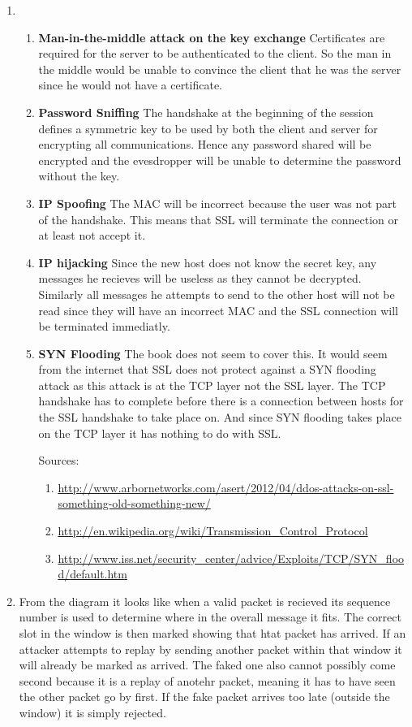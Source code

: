 \documentclass{article}
\begin{document}
\begin{enumerate}
  \item
    \begin{enumerate}
    \item 
      {\bf Man-in-the-middle attack on the key exchange} Certificates are required for the server to be authenticated to the client. So the man in the middle would be unable to convince the client that he was the server since he would not have a certificate.
    \item
      {\bf Password Sniffing} The handshake at the beginning of the session defines a symmetric key to be used by both the client and server for encrypting all communications. Hence any password shared will be encrypted and the evesdropper will be unable to determine the password without the key.
    \item
      {\bf IP Spoofing} The MAC will be incorrect because the user was not part of the handshake. This means that SSL will terminate the connection or at least not accept it.
    \item
      {\bf IP hijacking} Since the new host does not know the secret key, any messages he recieves will be useless as they cannot be decrypted. Similarly all messages he attempts to send to the other host will not be read since they will have an incorrect MAC and the SSL connection will be terminated immediatly.
    \item
      {\bf SYN Flooding} The book does not seem to cover this. It would seem from the internet that SSL does not protect against a SYN flooding attack as this attack is at the TCP layer not the SSL layer. The TCP handshake has to complete before there is a connection between hosts for the SSL handshake to take place on. And since SYN flooding takes place on the TCP layer it has nothing to do with SSL.
      
      Sources:
      \tiny
      \begin{enumerate}
      \item \url{http://www.arbornetworks.com/asert/2012/04/ddos-attacks-on-ssl-something-old-something-new/}
      \item \url{http://en.wikipedia.org/wiki/Transmission_Control_Protocol}
      \item \url{http://www.iss.net/security_center/advice/Exploits/TCP/SYN_flood/default.htm}
      \end{enumerate}
      \normalsize
    \end{enumerate}

  \item
    From the diagram it looks like when a valid packet is recieved its sequence number is used to determine where in the overall message it fits. The correct slot in the window is then marked showing that htat packet has arrived. If an attacker attempts to replay by sending another packet within that window it will already be marked as arrived. The faked one also cannot possibly come second because it is a replay of anotehr packet, meaning it has to have seen the other packet go by first. If the fake packet arrives too late (outside the window) it is simply rejected.


\end{enumerate}
\end{document}
